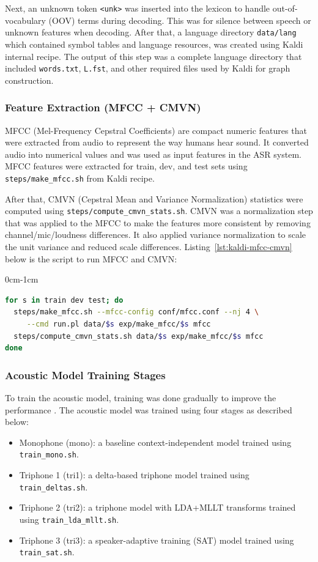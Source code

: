 Next, an unknown token \texttt{<unk>} was inserted into the lexicon to handle out-of-vocabulary (OOV) terms during decoding. This was for silence between speech or unknown features when decoding. After that, a language directory \texttt{data/lang} which contained symbol tables and language resources, was created using Kaldi internal recipe. The output of this step was a complete language directory that included \texttt{words.txt}, \texttt{L.fst}, and other required files used by Kaldi for graph construction.

\subsubsection{Feature Extraction (MFCC + CMVN)}
MFCC (Mel-Frequency Cepstral Coefficients) are compact numeric features that were extracted from audio to represent the way humans hear sound. It converted audio into numerical values and was used as input features in the ASR system. MFCC features were extracted for train, dev, and test sets using \texttt{steps/make\_mfcc.sh} from Kaldi recipe.

After that, CMVN (Cepstral Mean and Variance Normalization) statistics were computed using \texttt{steps/compute\_cmvn\_stats.sh}. CMVN was a normalization step that was applied to the MFCC to make the features more consistent by removing channel/mic/loudness differences. It also applied variance normalization to scale the unit variance and reduced scale differences. Listing~\ref{lst:kaldi-mfcc-cmvn} below is the script to run MFCC and CMVN:

\begin{adjustwidth}{0cm}{-1cm}
\begin{lstlisting}[language=Bash, breaklines=true, basicstyle=\ttfamily\small,
caption={MFCC and CMVN feature extraction}, label={lst:kaldi-mfcc-cmvn}]
for s in train dev test; do
  steps/make_mfcc.sh --mfcc-config conf/mfcc.conf --nj 4 \
     --cmd run.pl data/$s exp/make_mfcc/$s mfcc
  steps/compute_cmvn_stats.sh data/$s exp/make_mfcc/$s mfcc
done
\end{lstlisting}
\end{adjustwidth}

\subsubsection{Acoustic Model Training Stages}
To train the acoustic model, training was done gradually to improve the performance \parencite{kaldi2011}. The acoustic model was trained using four stages as described below:
\begin{itemize}[nosep]
    \item {Monophone (mono):} a baseline context-independent model trained using \texttt{train\_mono.sh}.
    \item {Triphone 1 (tri1):} a delta-based triphone model trained using \texttt{train\_deltas.sh}.
    \item {Triphone 2 (tri2):} a triphone model with LDA+MLLT transforms trained using \texttt{train\_lda\_mllt.sh}.
    \item {Triphone 3 (tri3):} a speaker-adaptive training (SAT) model trained using \texttt{train\_sat.sh}.
\end{itemize}

